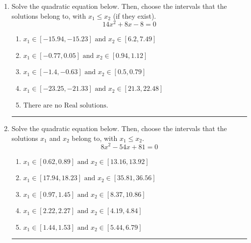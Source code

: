 \documentclass[14pt]{extbook}
\newcommand{\litem}[1]{\item#1\hspace*{-1cm}\rule{\textwidth}{0.4pt}}
\begin{document}
\begin{enumerate}
{\begin{enumerate}[label=\Alph*.]
\end{enumerate} }
\litem{
Solve the quadratic equation below. Then, choose the intervals that the solutions belong to, with $x_1 \leq x_2$ (if they exist).\[ 14x^{2} +8 x -8 = 0 \]\begin{enumerate}[label=\Alph*.]
\item \( x_1 \in [-15.94, -15.23] \text{ and } x_2 \in [6.2, 7.49] \)
\item \( x_1 \in [-0.77, 0.05] \text{ and } x_2 \in [0.94, 1.12] \)
\item \( x_1 \in [-1.4, -0.63] \text{ and } x_2 \in [0.5, 0.79] \)
\item \( x_1 \in [-23.25, -21.33] \text{ and } x_2 \in [21.3, 22.48] \)
\item \( \text{There are no Real solutions.} \)

\end{enumerate} }
\litem{
Solve the quadratic equation below. Then, choose the intervals that the solutions $x_1$ and $x_2$ belong to, with $x_1 \leq x_2$.\[ 8x^{2} -54 x + 81 = 0 \]\begin{enumerate}[label=\Alph*.]
\item \( x_1 \in [0.62, 0.89] \text{ and } x_2 \in [13.16, 13.92] \)
\item \( x_1 \in [17.94, 18.23] \text{ and } x_2 \in [35.81, 36.56] \)
\item \( x_1 \in [0.97, 1.45] \text{ and } x_2 \in [8.37, 10.86] \)
\item \( x_1 \in [2.22, 2.27] \text{ and } x_2 \in [4.19, 4.84] \)
\item \( x_1 \in [1.44, 1.53] \text{ and } x_2 \in [5.44, 6.79] \)


\end{enumerate}}
\end{enumerate}
\end{document}

